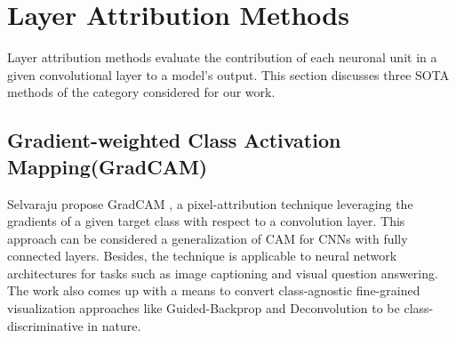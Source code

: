 \documentclass[../report.tex]{subfiles}
\begin{document}
\section{Layer Attribution Methods}
\noindent
Layer attribution methods evaluate the contribution of each neuronal unit in a given convolutional layer to a model's output. This section discusses three SOTA methods of the category considered for our work.
\subsection{Gradient-weighted Class Activation Mapping(GradCAM)}
\noindent
\label{sec_gradcam}
Selvaraju \etal propose GradCAM \cite{selvaraju2017grad}, a pixel-attribution technique leveraging the gradients of a given target class with respect to a convolution layer. This approach can be considered a generalization of CAM for CNNs with fully connected layers. Besides, the technique is applicable to neural network architectures for tasks such as image captioning and visual question answering. The work also comes up with a means to convert class-agnostic fine-grained visualization approaches like Guided-Backprop and Deconvolution to be class-discriminative in nature.
\end{document}
